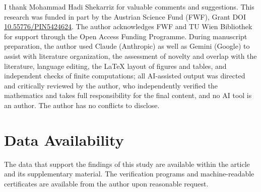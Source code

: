 \documentclass[aps,pra,reprint,superscriptaddress,longbibliography,nofootinbib,floatfix,10pt]{revtex4-2}
\theoremstyle{definition}\newtheorem{definition}[theorem]{Definition}
\theoremstyle{remark}\newtheorem{remark}[theorem]{Remark}
\begin{document}
\begin{acknowledgments}
I thank Mohammad Hadi Shekarriz for valuable comments and suggestions. This research was funded in part by the Austrian Science Fund (FWF), Grant DOI \href{https://doi.org/10.55776/PIN5424624}{10.55776/PIN5424624}. The author acknowledges FWF and TU Wien Bibliothek for support through the Open Access Funding Programme. During manuscript preparation, the author used Claude (Anthropic) as well as Gemini (Google) to assist with literature organization, the assessment of novelty and overlap with the literature, language editing, the LaTeX layout of figures and tables, and independent checks of finite computations; all AI-assisted output was directed and critically reviewed by the author, who independently verified the mathematics and takes full responsibility for the final content, and no AI tool is an author. The author has no conflicts to disclose.
\end{acknowledgments}

\section*{Data Availability}
The data that support the findings of this study are available within the article and its supplementary material. The verification programs and machine-readable certificates are available from the author upon reasonable request.


\end{document}
